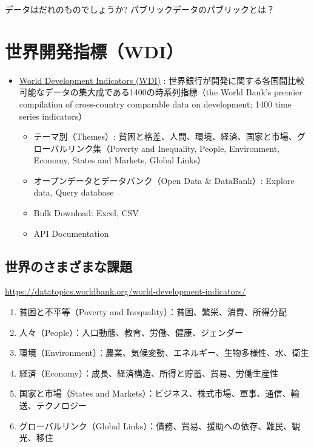 \documentclass[
  xelatex, ja=standard]{bxjsbook}
\providecommand{\tightlist}{%
  \setlength{\itemsep}{0pt}\setlength{\parskip}{0pt}}
\theoremstyle{definition}
\theoremstyle{definition}
\theoremstyle{definition}
\theoremstyle{definition}
\theoremstyle{remark}
\begin{document}
データはだれのものでしょうか? パブリックデータのパブリックとは？

\hypertarget{ux4e16ux754cux958bux767aux6307ux6a19wdi-1}{%
\section{世界開発指標（WDI）}\label{ux4e16ux754cux958bux767aux6307ux6a19wdi-1}}

\begin{itemize}
\tightlist
\item
  \href{https://datatopics.worldbank.org/world-development-indicators/}{World Development Indicators (WDI)} : 世界銀行が開発に関する各国間比較可能なデータの集大成である1400の時系列指標（the World Bank's premier compilation of cross-country comparable data on development; 1400 time series indicators）

  \begin{itemize}
  \tightlist
  \item
    テーマ別（Themes）: 貧困と格差、人間、環境、経済、国家と市場、グローバルリンク集（Poverty and Inequality, People, Environment, Economy, States and Markets, Global Links）
  \item
    オープンデータとデータバンク（Open Data \& DataBank）: Explore data, Query database
  \item
    Bulk Download: Excel, CSV
  \item
    API Documentation
  \end{itemize}
\end{itemize}

\hypertarget{ux4e16ux754cux306eux3055ux307eux3056ux307eux306aux8ab2ux984c}{%
\subsection{世界のさまざまな課題}\label{ux4e16ux754cux306eux3055ux307eux3056ux307eux306aux8ab2ux984c}}

\url{https://datatopics.worldbank.org/world-development-indicators/}

\begin{enumerate}
\def\labelenumi{\arabic{enumi}.}
\tightlist
\item
  貧困と不平等（Poverty and Inequality）：貧困、繁栄、消費、所得分配
\item
  人々（People）：人口動態、教育、労働、健康、ジェンダー
\item
  環境（Environment）：農業、気候変動、エネルギー、生物多様性、水、衛生
\item
  経済（Economy）：成長、経済構造、所得と貯蓄、貿易、労働生産性
\item
  国家と市場（States and Markets）：ビジネス、株式市場、軍事、通信、輸送、テクノロジー
\item
  グローバルリンク（Global Links）：債務、貿易、援助への依存、難民、観光、移住
\end{enumerate}
\end{document}
